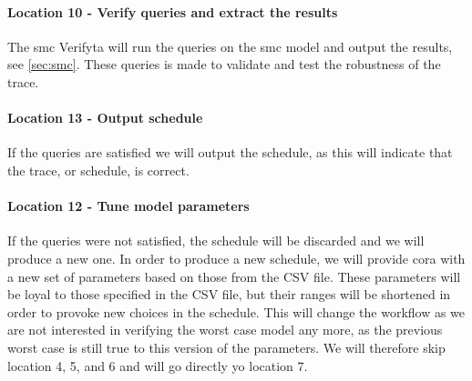 
\paragraph{Location 10 - Verify queries and extract the results} 
The \gls{smc} Verifyta will run the queries on the \gls{smc} model and output the results, see \cref{sec:smc}. 
These queries is made to validate and test the robustness of the trace.

\paragraph{Location 13 - Output schedule} 
If the queries are satisfied we will output the schedule, as this will indicate that the trace, or schedule, is correct.

\paragraph{Location 12 - Tune model parameters} 
If the queries were not satisfied, the schedule will be discarded and we will produce a new one. 
In order to produce a new schedule, we will provide \gls{cora} with a new set of parameters based on those from the CSV file. 
These parameters will be loyal to those specified in the CSV file, but their ranges will be shortened in order to provoke new choices in the schedule. 
This will change the workflow as we are not interested in verifying the worst case model any more, as the previous worst case is still true to this version of the parameters. 
We will therefore skip location 4, 5, and 6 and will go directly yo location 7.

